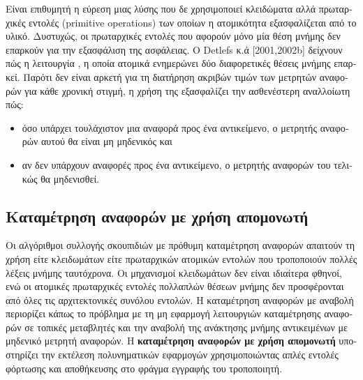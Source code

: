 \begin{greek}
Είναι επιθυμητή η εύρεση μιας λύσης που δε χρησιμοποιεί κλειδώματα αλλά πρωταρχικές εντολές
(primitive operations) των οποίων η ατομικότητα εξασφαλίζεται από το υλικό. Δυστυχώς, οι πρωταρχικές 
εντολές που αφορούν μόνο μία θέση μνήμης δεν επαρκούν για την εξασφάλιση της ασφάλειας.
Ο Detlefs κ.ά \cite{DBLP:conf/podc/DetlefsMMS01} [2001,2002b] δείχνουν πώς η λειτουργία , η οποία
ατομικά ενημερώνει δύο διαφορετικές θέσεις μνήμης επαρκεί. Παρότι δεν είναι αρκετή για τη διατήρηση
ακριβών τιμών των μετρητών αναφορών για κάθε χρονική στιγμή, η χρήση της εξασφαλίζει την ασθενέστερη
αναλλοίωτη πώς:
\begin{itemize}
\item όσο υπάρχει τουλάχιστον μια αναφορά προς ένα αντικείμενο, ο μετρητής αναφορών αυτού θα είναι
μη μηδενικός και
\item αν δεν υπάρχουν αναφορές προς ένα αντικείμενο, ο μετρητής αναφορών του τελικώς θα μηδενισθεί.
\end{itemize}

\subsection{Καταμέτρηση αναφορών με χρήση απομονωτή}
Οι αλγόριθμοι συλλογής σκουπιδιών με πρόθυμη καταμέτρηση
αναφορών απαιτούν τη χρήση είτε κλειδωμάτων είτε πρωταρχικών
ατομικών εντολών που τροποποιούν πολλές λέξεις μνήμης
ταυτόχρονα. Οι μηχανισμοί κλειδωμάτων δεν είναι ιδιαίτερα
φθηνοί, ενώ οι ατομικές πρωταρχικές εντολές πολλαπλών θέσεων
μνήμης δεν προσφέρονται από όλες τις αρχιτεκτονικές συνόλου
εντολών. Η καταμέτρηση αναφορών με αναβολή περιορίζει κάπως
το πρόβλημα με τη μη εφαρμογή λειτουργιών καταμέτρησης αναφορών
σε τοπικές μεταβλητές και την αναβολή της ανάκτησης μνήμης
αντικειμένων με μηδενικό μετρητή αναφορών. H
\textbf{καταμέτρηση αναφορών με χρήση απομονωτή} υποστηρίζει
την εκτέλεση πολυνηματικών εφαρμογών χρησιμοποιώντας απλές
εντολές φόρτωσης και αποθήκευσης στο φράγμα εγγραφής του
τροποποιητή.


\end{greek}
